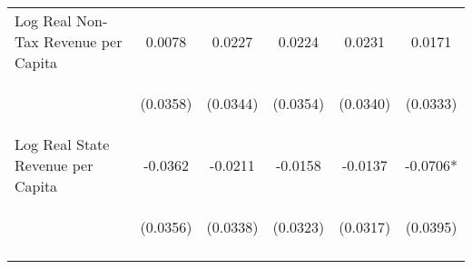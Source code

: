 \begin{center}
\begin{tabular}{lccccc}
\noalign{\smallskip}Log Real Non-Tax Revenue per Capita & \begin{scriptsize}0.0078\end{scriptsize} & \begin{scriptsize}0.0227\end{scriptsize} & \begin{scriptsize}0.0224\end{scriptsize} & \begin{scriptsize}0.0231\end{scriptsize} & \begin{scriptsize}0.0171\end{scriptsize}\\
 & \begin{scriptsize}(0.0358)\end{scriptsize} & \begin{scriptsize}(0.0344)\end{scriptsize} & \begin{scriptsize}(0.0354)\end{scriptsize} & \begin{scriptsize}(0.0340)\end{scriptsize} & \begin{scriptsize}(0.0333)\end{scriptsize}\\
\noalign{\smallskip}Log Real State Revenue per Capita & \begin{scriptsize}-0.0362\end{scriptsize} & \begin{scriptsize}-0.0211\end{scriptsize} & \begin{scriptsize}-0.0158\end{scriptsize} & \begin{scriptsize}-0.0137\end{scriptsize} & \begin{scriptsize}-0.0706*\end{scriptsize}\\
 & \begin{scriptsize}(0.0356)\end{scriptsize} & \begin{scriptsize}(0.0338)\end{scriptsize} & \begin{scriptsize}(0.0323)\end{scriptsize} & \begin{scriptsize}(0.0317)\end{scriptsize} & \begin{scriptsize}(0.0395)\end{scriptsize}\\
\noalign{\smallskip}\hline\end{tabular}\\
\end{center}
